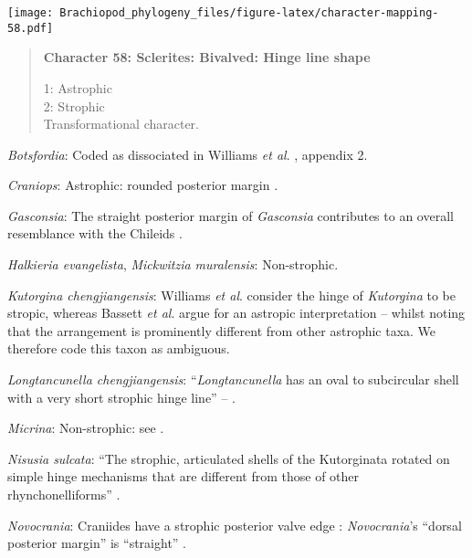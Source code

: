 \documentclass[openany]{book}
\theoremstyle{definition}
\theoremstyle{definition}
\theoremstyle{definition}
\theoremstyle{remark}
\begin{document}
\texttt{[image: Brachiopod\_phylogeny\_files/figure-latex/character-mapping-58.pdf]}

\begin{quote}
\textbf{Character 58: Sclerites: Bivalved: Hinge line shape}

1: Astrophic\\
2: Strophic\\
Transformational character.
\end{quote}

\hypertarget{Botsfordia-coding-58}{}
\emph{Botsfordia}: Coded as dissociated in Williams \emph{et al}.
\citeyearpar{Williams1998Thediversity}, appendix 2.

\hypertarget{Craniops-coding-58}{}
\emph{Craniops}: Astrophic: rounded posterior margin \citep[see fig. 91
in][]{Williams2000LinguliformeaCraniiformea}.

\hypertarget{Gasconsia-coding-58}{}
\emph{Gasconsia}: The straight posterior margin of \emph{Gasconsia}
contributes to an overall resemblance with the Chileids
\citep{Holmer2014Ordovician96}.

\hypertarget{Halkieria_evangelista-coding-58}{}
\emph{Halkieria evangelista}, \emph{Mickwitzia muralensis}:
Non-strophic.

\hypertarget{Kutorgina_chengjiangensis-coding-58}{}
\emph{Kutorgina chengjiangensis}: Williams \emph{et al}.
\citeyearpar[p.~208]{Williams2000LinguliformeaCraniiformea} consider the
hinge of \emph{Kutorgina} to be stropic, whereas Bassett \emph{et al}.
\citeyearpar{Bassett2001Functionalmorphology} argue for an astropic
interpretation -- whilst noting that the arrangement is prominently
different from other astrophic taxa. We therefore code this taxon as
ambiguous.

\hypertarget{Longtancunella_chengjiangensis-coding-58}{}
\emph{Longtancunella chengjiangensis}: ``\emph{Longtancunella} has an
oval to subcircular shell with a very short strophic hinge line'' --
\citet{Zhang2011Theexceptionally}.

\hypertarget{Micrina-coding-58}{}
\emph{Micrina}: Non-strophic: see \citet{Holmer2008TheEarly}.

\hypertarget{Nisusia_sulcata-coding-58}{}
\emph{Nisusia sulcata}: ``The strophic, articulated shells of the
Kutorginata rotated on simple hinge mechanisms that are different from
those of other rhynchonelliforms''
\citep[p.~208]{Williams2000LinguliformeaCraniiformea}.

\hypertarget{Novocrania-coding-58}{}
\emph{Novocrania}: Craniides have a strophic posterior valve edge
\citep[table 39 on p.~2853]{Williams2007Supplement}: \emph{Novocrania}'s
``dorsal posterior margin'' is ``straight''
\citep[p.~171]{Williams2000LinguliformeaCraniiformea}.
\end{document}

